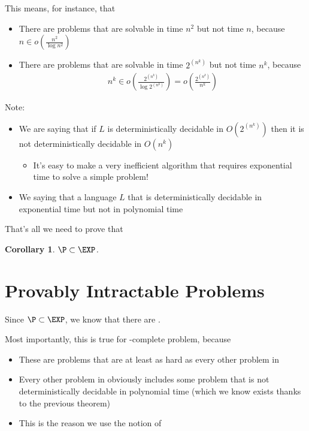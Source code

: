 \documentclass[a4paper]{report}
\newtheorem{coro}{Corollary}
\newcommand{\bookref}[3]{\marginpar{\faBook{}~#1\\Chapter #2\\Section #3}}
\theoremstyle{definition}
\begin{document}
This means, for instance, that
\begin{itemize}
\item There are problems that are solvable in time $n^2$ but not time $n$, because $n \in o\left(\frac{n^2}{\log n^2}\right)$
\item There are problems that are solvable in time $2^{(n^k)}$ but not time $n^k$, because
\begin{align*}
n^k \in o\left(\frac{2^{(n^k)}}{\log 2^{(n^k)}}\right) = o\left(\frac{2^{(n^k)}}{n^k}\right)
\end{align*}
\end{itemize}

Note:
\begin{itemize}
\item We are  saying that if $L$ is deterministically decidable in $O(2^{(n^k)})$ then it is not deterministically decidable in $O(n^k)$
\begin{itemize}
\item It's easy to make a very inefficient algorithm that requires exponential time to solve a simple problem!
\end{itemize}
\item We  saying that  a language $L$ that is deterministically decidable in exponential time but not in polynomial time
\end{itemize}

That's all we need to prove that
\begin{coro}
$\P \subset \EXP$.
\end{coro}


\section{Provably Intractable Problems}
\bookref{ER}{28}{28.9.2}
Since $\P \subset \EXP$, we know that there are .

Most importantly, this is true for  \EXP-complete problem, because
\begin{itemize}
\item These are problems that are at least as hard as every other problem in \EXP
\item Every other problem in \EXP{} obviously includes some problem that is not deterministically decidable in polynomial time (which we know exists thanks to the previous theorem)
\item This is the reason we use the notion of 
\end{itemize}
\end{document}
